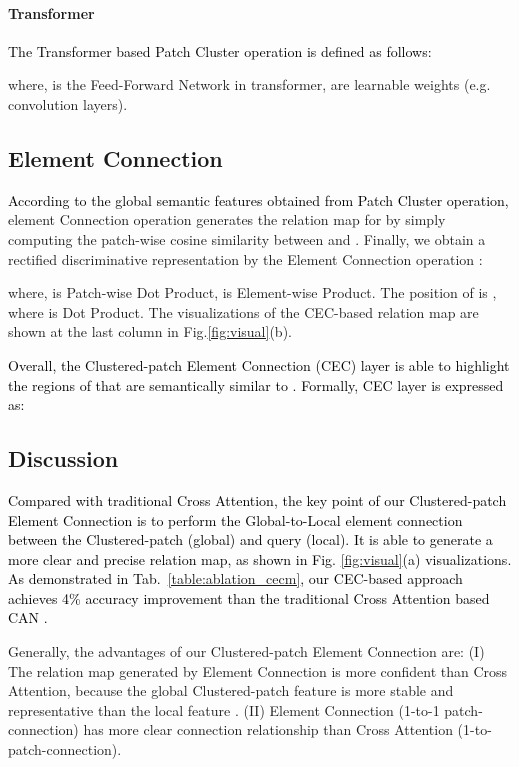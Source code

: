\documentclass{article}
\newcommand{\ljx}[1]{\textcolor{black}{#1}}
\newcommand{\seasons}[1]{\textcolor{black}{#1}}
\begin{document}
\paragraph{Transformer}
\seasons{The Transformer\cite{vaswani2017attention} based Patch Cluster operation is defined as follows:}
\begin{small}

\end{small}where,  is the Feed-Forward Network in transformer,  are learnable weights (e.g. convolution layers).


\subsection{Element Connection}
\seasons{According to the global semantic features  obtained from Patch Cluster operation, } element Connection operation generates the relation map  for  by simply computing the patch-wise cosine similarity between  and .
Finally, we obtain a rectified discriminative representation by the Element Connection operation :
\begin{small}

\end{small}where,  is Patch-wise Dot Product,  is Element-wise Product. The  position of  is , where  is Dot Product.
The visualizations of the CEC-based relation map  are shown at the last column in Fig.\ref{fig:visual}(b).
\ljx{
Overall, the Clustered-patch Element Connection (CEC) layer is able to highlight the regions of  that are semantically similar to . Formally, CEC layer  is expressed as:

}

\subsection{Discussion}
\seasons{Compared with traditional Cross Attention, the key point of our Clustered-patch Element Connection is to perform the Global-to-Local element connection between the Clustered-patch  (global) and query  (local).
It is able to generate a more clear and precise relation map, as shown in Fig. \ref{fig:visual}(a) visualizations.
As demonstrated in Tab.~\ref{table:ablation_cecm}, our CEC-based approach achieves 4\% accuracy improvement than the traditional Cross Attention based CAN \cite{hou2019cross}.}

Generally, the advantages of our Clustered-patch Element Connection are: (I) The relation map generated by Element Connection is more confident than Cross Attention, because the global Clustered-patch feature  is more stable and representative than the local feature . (II) Element Connection (1-to-1 patch-connection) has more clear connection relationship than Cross Attention (1-to- patch-connection).
\end{document}
